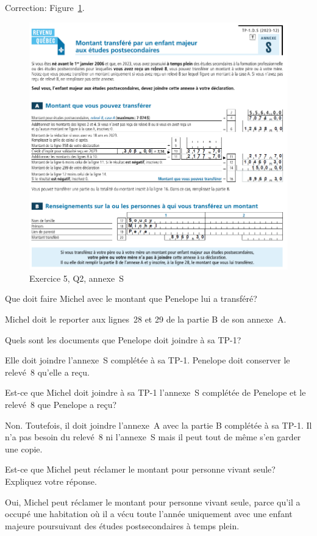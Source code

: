 Correction: Figure~\ref{fig:chap4Exercice5Q2AnnexeS}.
\begin{figure}
	\centering
	\includegraphics[width=.9\textwidth]{exercice/4-5/Q2/Annexe-S.png}
	\caption{Exercice 5, Q2, annexe~S}
	\label{fig:chap4Exercice5Q2AnnexeS}
\end{figure}

\begin{sousQuestion}
	Que doit faire Michel avec le montant que Penelope lui a transféré?
\end{sousQuestion}
Michel doit le reporter aux lignes~28 et 29 de la partie B de son annexe~A.

\begin{sousQuestion}
	Quels sont les documents que Penelope doit joindre à sa TP-1?
\end{sousQuestion}
Elle doit joindre l'annexe~S complétée à sa TP-1. Penelope doit conserver le relevé~8 qu'elle a reçu.

\begin{sousQuestion}
	Est-ce que Michel doit joindre à sa TP-1 l'annexe~S complétée de Penelope et le relevé~8 que Penelope a reçu?
\end{sousQuestion}
Non. Toutefois, il doit joindre l'annexe~A avec la partie B complétée à sa TP-1. Il n'a pas besoin du relevé~8  ni l'annexe~S mais il peut tout de même s'en garder une copie.

\begin{sousQuestion}
	Est-ce que Michel peut réclamer le montant pour personne vivant seule? Expliquez votre réponse.
\end{sousQuestion}
Oui, Michel peut réclamer le montant pour personne vivant seule, parce qu'il a occupé une habitation où il a vécu toute l'année uniquement avec une enfant majeure poursuivant des études postsecondaires à temps plein.

